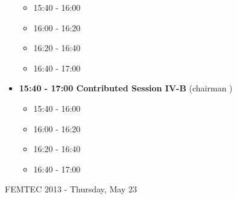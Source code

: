 \documentclass[10pt, A4]{article}%
\begin{document}
\begin{itemize}
  \begin{itemize}
    \item 15:40 - 16:00
    \item 16:00 - 16:20 
    \item 16:20 - 16:40 
    \item 16:40 - 17:00
  \end{itemize}
  \item {\bf 15:40 - 17:00 Contributed Session IV-B} (chairman ) 
  \begin{itemize}
    \item 15:40 - 16:00
    \item 16:00 - 16:20 
    \item 16:20 - 16:40 
    \item 16:40 - 17:00
  \end{itemize}  
\end{itemize}

\newpage
\newpage

\centerline{\huge FEMTEC 2013 - Thursday, May 23}
\vspace{4mm}
\end{document}

